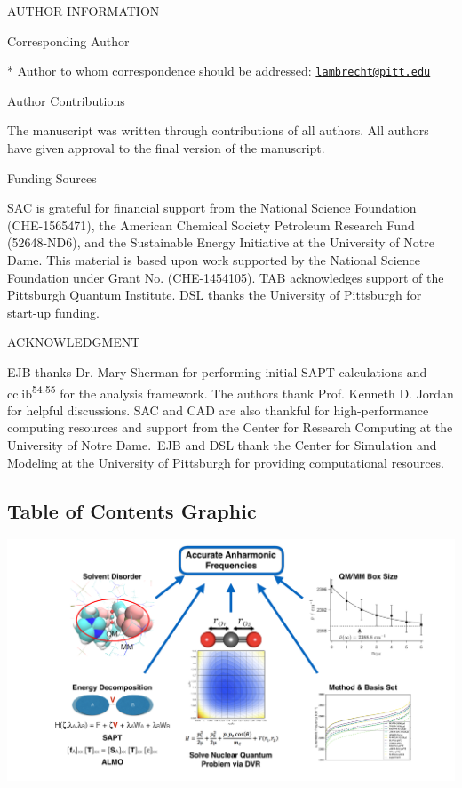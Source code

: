 AUTHOR INFORMATION

Corresponding Author

* Author to whom correspondence should be addressed: \href{mailto:lambrecht@pitt.edu}{\nolinkurl{lambrecht@pitt.edu}}

Author Contributions

The manuscript was written through contributions of all authors. All authors have given approval to the final version of the manuscript.

Funding Sources

SAC is grateful for financial support from the National Science Foundation (CHE-1565471), the American Chemical Society Petroleum Research Fund (52648-ND6), and the Sustainable Energy Initiative at the University of Notre Dame. This material is based upon work supported by the National Science Foundation under Grant No. (CHE-1454105). TAB acknowledges support of the Pittsburgh Quantum Institute. DSL thanks the University of Pittsburgh for start-up funding.

ACKNOWLEDGMENT

EJB thanks Dr. Mary Sherman for performing initial SAPT calculations and cclib\textsuperscript{54,55} for the analysis framework. The authors thank Prof. Kenneth D. Jordan for helpful discussions. SAC and CAD are also thankful for high-performance computing resources and support from the Center for Research Computing at the University of Notre Dame.~EJB and DSL thank the Center for Simulation and Modeling at the University of Pittsburgh for providing computational resources.

\subsection{Table of Contents Graphic}
\label{table-of-contents-graphic}

\includegraphics[width=\textwidth]{paper_02/TOC.pdf}

